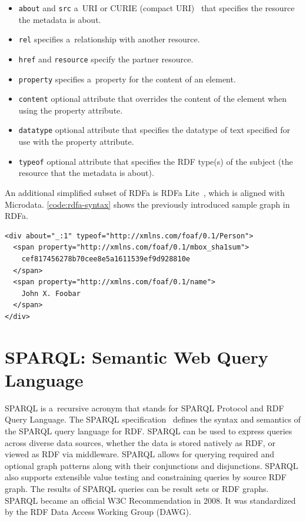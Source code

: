 \begin{itemize}
  \item \texttt{about} and \texttt{src} a~URI or
        CURIE (compact URI)~\cite{birbeck2007curie}
        that specifies the resource
        the metadata is about.
  \item \texttt{rel} specifies a~relationship with
        another resource.
  \item \texttt{href} and \texttt{resource} specify
        the partner resource.
  \item \texttt{property} specifies a~property for
        the content of an element.
  \item \texttt{content} optional attribute that overrides
        the content of the element when using
        the property attribute.
  \item \texttt{datatype} optional attribute that
        specifies the datatype of text specified
        for use with the property attribute.
  \item \texttt{typeof} optional attribute that specifies
        the RDF type(s) of the subject (the resource
        that the metadata is about).
\end{itemize}

An additional simplified subset of RDFa is RDFa Lite~\cite{sporny2012rdfaalite}, which is aligned with Microdata.
\autoref{code:rdfa-syntax} shows the previously introduced
sample graph in RDFa.

\begin{lstlisting}[caption={Sample graph in RDFa syntax},
  label={code:rdfa-syntax}]
<div about="_:1" typeof="http://xmlns.com/foaf/0.1/Person">
  <span property="http://xmlns.com/foaf/0.1/mbox_sha1sum">
    cef817456278b70cee8e5a1611539ef9d928810e
  </span>
  <span property="http://xmlns.com/foaf/0.1/name">
    John X. Foobar
  </span>
</div>
\end{lstlisting}

\section{SPARQL: Semantic Web Query Language}

SPARQL is a~recursive acronym that stands for
SPARQL Protocol and RDF Query Language.
The SPARQL specification~\cite{prudhommeaux2008sparql}
defines the syntax and semantics
of the SPARQL query language for RDF.
SPARQL can be used to express queries
across diverse data sources,
whether the data is stored natively as RDF,
or viewed as RDF via middleware.
SPARQL allows for querying required
and optional graph patterns
along with their conjunctions and disjunctions.
SPARQL also supports extensible value testing
and constraining queries by source RDF graph.
The results of SPARQL queries can be result sets or RDF graphs.
SPARQL became an official W3C Recommendation in 2008.
It was standardized by the RDF Data Access Working Group (DAWG).

